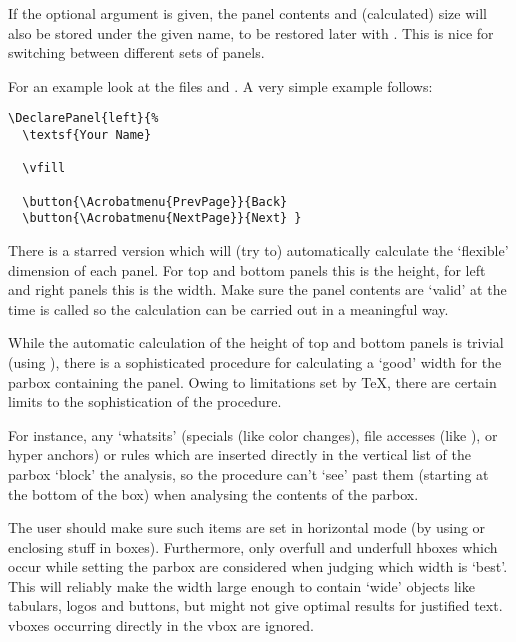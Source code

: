 \begin{slide}
  If the optional argument  is given, the panel contents and
  (calculated) size will also be stored under the given name, to be restored
  later with . This is nice for switching between
  different sets of panels.

  \newslide

  For an example look at the files  and .
  A very simple example follows:

  \begin{verbatim}
\DeclarePanel{left}{%
  \textsf{Your Name}

  \vfill

  \button{\Acrobatmenu{PrevPage}}{Back}
  \button{\Acrobatmenu{NextPage}}{Next} }
\end{verbatim}

  \newslide

  There is a starred version which will (try to) automatically calculate the
   `flexible' dimension of each panel. For top and
  bottom panels this is the height, for left and right panels this is the width.
  Make sure the panel contents are `valid' at the time 
  is called so the calculation can be carried out in a meaningful way.

  While the automatic calculation of the height of top and bottom panels is
  trivial (using ), there is a sophisticated procedure
  for calculating a `good' width for the parbox containing the panel. Owing to
  limitations set by TeX, there are certain limits to the sophistication of the
  procedure.

  \newslide

  For instance, any `whatsits' (specials (like color changes), file
  accesses (like ), or hyper anchors)
  or rules which are inserted directly in the vertical list of the parbox
  `block' the analysis, so the procedure can't `see' past them (starting at the
  bottom of the box) when analysing the contents of the parbox.

  The user should make sure such items are set in horizontal mode (by using
   or enclosing stuff in boxes). Furthermore, only
  overfull and underfull hboxes which occur while setting the parbox are
  considered when judging which width is `best'. This will reliably make the
  width large enough to contain `wide' objects like tabulars, logos and buttons,
  but might not give optimal results for justified text.  vboxes occurring
  directly in the vbox are ignored.


\end{slide}
